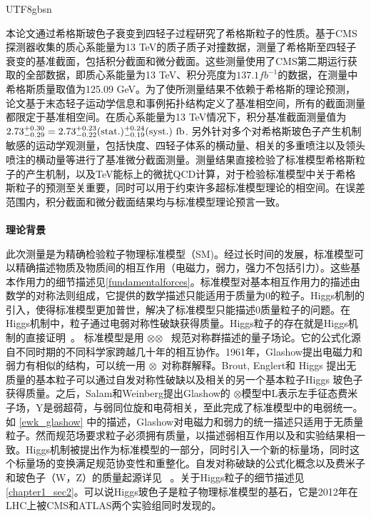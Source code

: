 \begin{CJK}{UTF8}{gbsn}
\par 本论文通过希格斯玻色子衰变到四轻子过程研究了希格斯粒子的性质。基于CMS探测器收集的质心系能量为13 TeV的质子质子对撞数据，测量了希格斯至四轻子衰变的基准截面，包括积分截面和微分截面。这些测量使用了CMS第二期运行获取的全部数据，即质心系能量为13 TeV、积分亮度为$137.1 fb^{−1}$的数据，在测量中希格斯质量取值为125.09 GeV。为了使所测量结果不依赖于希格斯的理论预测，论文基于末态轻子运动学信息和事例拓扑结构定义了基准相空间，所有的截面测量都限定于基准相空间。在质心系能量为13 TeV情况下，积分基准截面测量值为$2.73^{+0.30}_{-0.29}=2.73^{+0.23}_{-0.22}({\rm stat.})^{+0.24}_{-0.19}({\rm syst.})~{\rm fb}$. 另外针对多个对希格斯玻色子产生机制敏感的运动学观测量，包括快度、四轻子体系的横动量、相关的多重喷注以及领头喷注的横动量等进行了基准微分截面测量。测量结果直接检验了标准模型希格斯粒子的产生机制，以及TeV能标上的微扰QCD计算，对于检验标准模型中关于希格斯粒子的预测至关重要，同时可以用于约束许多超标准模型理论的相空间。在误差范围内，积分截面和微分截面结果均与标准模型理论预言一致。\\ 
\\
\textbf{\large{理论背景}} %
	\par 此次测量是为精确检验粒子物理标准模型（SM)。经过长时间的发展，标准模型可以精确描述物质及物质间的相互作用（电磁力，弱力，强力不包括引力）。这些基本作用力的细节描述见\ref{fundamentalforces}。标准模型对基本相互作用力的描述由数学的对称法则组成，它提供的数学描述只能适用于质量为0的粒子。Higgs机制的引入，使得标准模型更加普世，解决了标准模型只能描述0质量粒子的问题。在Higgs机制中，粒子通过电弱对称性破缺获得质量。Higgs粒子的存在就是Higgs机制的直接证明~\cite{Reference7,Reference8,Reference9,Reference10,Reference11,Reference12}。
标准模型是用 \suthreec$\otimes$\sutwol$\otimes$\uoneg~ 规范对称群描述的量子场论。它的公式化源自不同时期的不同科学家跨越几十年的相互协作。1961年，Glashow提出电磁力和弱力有相似的结构，可以统一用 \sutwol$\otimes$\uoneg ~对称群解释。Brout, Englert和 Higgs 提出无质量的基本粒子可以通过自发对称性破缺以及相关的另一个基本粒子Higgs 玻色子获得质量。之后，Salam和Weinberg提出Glashow的 \sutwol$\otimes$\uoneg 模型中L表示左手征态费米子场，Y是弱超荷，与弱同位旋和电荷相关，至此完成了标准模型中的电弱统一。如 \ref{ewk_glashow} 中的描述，Glashow对电磁力和弱力的统一描述只适用于无质量粒子。然而规范场要求粒子必须拥有质量，以描述弱相互作用以及和实验结果相一致。Higgs机制被提出作为标准模型的一部分，同时引入一个新的标量场，同时这个标量场的变换满足规范协变性和重整化。自发对称破缺的公式化概念以及费米子和玻色子（W，Z）的质量起源详见 ~\cite{Reference7,Reference8,Reference9,Reference10,Reference11,Reference12}。关于Higgs粒子的细节描述见\ref{chapter1_sec2}。可以说Higgs玻色子是粒子物理标准模型的基石，它是2012年在LHC上被CMS和ATLAS两个实验组同时发现的。\\  \\

\end{CJK}
